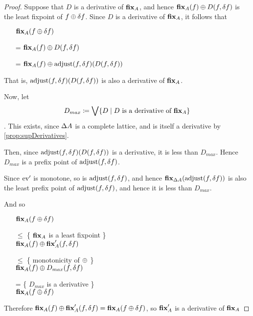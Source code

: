 \begin{proof}
  Suppose that $D$ is a derivative of $\textbf{fix}_A$, and hence $\textbf{fix}_A(f) \oplus D(f,
  \delta f)$ is the least fixpoint of $f \oplus \delta f$. 
  Since $D$ is a derivative of $\textbf{fix}_A$, it follows that 
  \begin{itemize}
    \item[ ]$\textbf{fix}_A (f \oplus \delta f)$
    \item[=]$\textbf{fix}_A(f) \oplus D(f, \delta f)$
    \item[=]$\textbf{fix}_A(f) \oplus \operatorname{adjust}(f, \delta f)(D(f, \delta f))$
  \end{itemize}

  That is, $\operatorname{adjust}(f, \delta f)(D(f, \delta f))$ is also a
  derivative of $\textbf{fix}_A$.

  Now, let $$D_{max} \coloneqq \bigvee \{D \mid D \textrm{ is a derivative of }
  \textbf{fix}_A \}$$. This exists, since $\Delta A$ is a complete lattice, and
  is itself a derivative by \cref{prop:supDerivatives}.

  Then, since 
  $\operatorname{adjust}(f, \delta f)(D(f, \delta f))$ is a
  derivative, it is less than $D_{max}$. Hence $D_{max}$ is a prefix point of
  $\operatorname{adjust}(f, \delta f)$.

  Since $\operatorname{ev}'$ is monotone, so is $\operatorname{adjust}(f, \delta f)$, and
  hence $\textbf{fix}_{\Delta A}(\operatorname{adjust}(f, \delta f))$ is also the
  least prefix point of $\operatorname{adjust}(f, \delta f)$, and hence it is less
  than $D_{max}$.

  And so 
  \begin{itemize}
    \item[ ]
      $\textbf{fix}_A(f \oplus \delta f)$
    \item[$\leq$]\{ $\textbf{fix}_A$ is a least fixpoint \}\\
      $\textbf{fix}_A(f) \oplus \textbf{fix}_A'(f, \delta f)$
    \item[$\leq$]\{ monotonicity of $\oplus$ \}\\
      $\textbf{fix}_A(f) \oplus D_{max}(f, \delta f)$
    \item[=]\{ $D_{max}$ is a derivative \}\\
      $\textbf{fix}_A(f \oplus \delta f)$
  \end{itemize}

  Therefore $\textbf{fix}_A(f) \oplus \textbf{fix}_A'(f, \delta f) =
  \textbf{fix}_A(f \oplus \delta f)$, so $\textbf{fix}_A'$ is a derivative of $\textbf{fix}_A$
\end{proof}

